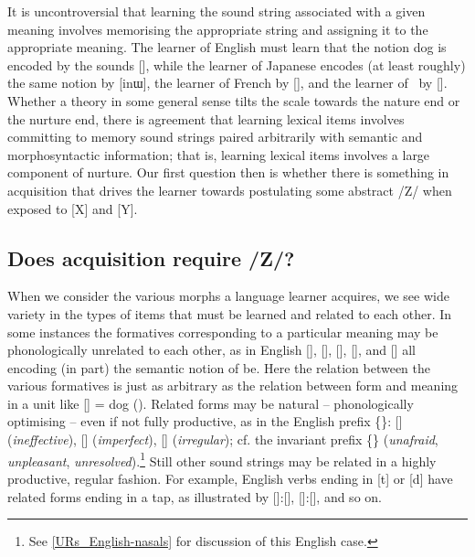 It is uncontroversial that learning the sound string associated with a given meaning involves memorising the appropriate string and assigning it to the appropriate meaning. The learner of English must learn that the notion {\sc dog} is encoded by the sounds [], while the learner of Japanese encodes (at least roughly) the same notion by [inɯ], the learner of French  by [], and the learner of \Y\ by []. Whether a theory in some general sense tilts the scale towards the nature end or the nurture end, there is agreement that learning lexical items involves committing to memory sound strings paired arbitrarily with  semantic and morphosyntactic information; that is, learning lexical items involves a large component of  nurture. Our first question then is whether there is something in acquisition that drives the learner towards postulating some abstract /Z/ when exposed to [X] and [Y].

\subsection{Does acquisition require /Z/?}

When we consider the various morphs a language learner acquires, we see wide variety in the types of items that must be learned and related to each other. In some instances the formatives corresponding to a particular meaning may be phonologically unrelated to each other, as in English [], [], [], [], and [] all encoding (in part) the semantic notion of {\sc be}. Here the relation between the various formatives is just as arbitrary as the relation between form and meaning in a unit like [] = {\sc dog} (\citealt{deSaussure:1916}). Related forms may be natural -- phonologically optimising -- even if not fully productive, as in the English  prefix \{\}: [] (\textit{ineffective}), [] (\textit{imperfect}), [] (\textit{irregular}); cf. the invariant prefix \{\} (\textit{unafraid}, \textit{unpleasant}, \textit{unresolved}).\footnote{See \textsection\ref{URs_English-nasals} for discussion of this English case.} Still other sound strings may be related in a highly productive, regular fashion. For example, English verbs ending in [t] or [d] have related forms ending in a tap, as illustrated by []:[], []:[], and so on.

